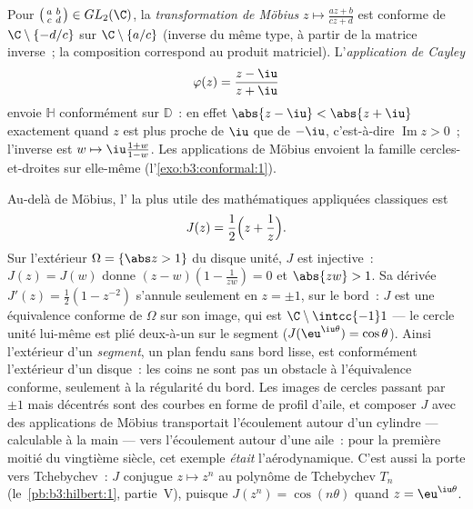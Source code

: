 \begin{example}
\label{ex:b3:conformal:mobius}
Pour $\bigl(\begin{smallmatrix}a & b\\ c &
d\end{smallmatrix}\bigr) \in GL_2(\C)$, la \emph{transformation
de Möbius} $z \mapsto
\frac{az + b}{cz + d}$ est conforme de $\C\setminus\{-d/c\}$
sur $\C\setminus\{a/c\}$ (inverse du même type, à partir de
la matrice inverse~; la composition correspond au produit
matriciel). L'\emph{application de Cayley}
\[
\varphi(z) = \frac{z - \iu}{z + \iu}
\]
envoie $\mathbb H$ conformément sur $\mathbb D$~: en effet
$\abs{z - \iu} < \abs{z + \iu}$ exactement quand $z$ est plus
proche de $\iu$ que de $-\iu$, c'est-à-dire
$\operatorname{Im}z > 0$~; l'inverse est $w \mapsto
\iu\frac{1 + w}{1 - w}$. Les applications de Möbius envoient
la famille cercles-et-droites sur elle-même
(l'\cref{exo:b3:conformal:1}).
\end{example}

\begin{example}\label{ex:b3:conformal:joukowski}
Au-delà de Möbius, l' la plus utile des
mathématiques appliquées classiques est
\[
J(z) = \frac12\Bigl(z + \frac1z\Bigr) .
\]
Sur l'extérieur $\Omega = \{\abs z > 1\}$ du disque unité,
$J$ est injective~: $J(z) = J(w)$ donne $(z - w)(1 -
\frac1{zw}) = 0$ et $\abs{zw} > 1$. Sa dérivée $J'(z) =
\frac12(1 - z^{-2})$ s'annule seulement en $z = \pm1$, sur le
bord~: $J$ est une équivalence conforme de $\Omega$ sur son
image, qui est $\C\setminus\intcc{-1}1$ --- le cercle unité
lui-même est plié deux-à-un sur le segment
($J(\eu^{\iu\theta}) = \cos\theta$). Ainsi l'extérieur d'un
\emph{segment}, un plan fendu sans bord lisse, est
conformément l'extérieur d'un disque~: les coins ne sont pas
un obstacle à l'équivalence conforme, seulement à la
régularité du bord. Les images de cercles passant par $\pm1$
mais décentrés sont des courbes en forme de profil d'aile, et
composer $J$ avec des applications de Möbius transportait
l'écoulement autour d'un cylindre --- calculable à la main ---
vers l'écoulement autour d'une aile~: pour la première moitié
du vingtième siècle, cet exemple \emph{était}
l'aérodynamique. C'est aussi la porte vers Tchebychev~: $J$
conjugue $z \mapsto z^n$ au polynôme de Tchebychev $T_n$
(le~\cref{pb:b3:hilbert:1}, partie~V), puisque $J(z^n) =
\cos(n\theta)$ quand $z = \eu^{\iu\theta}$.
\end{example}


